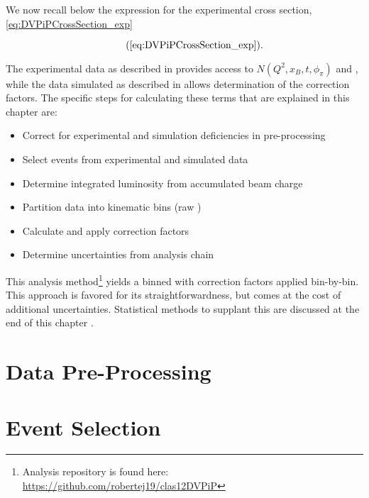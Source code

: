 We now recall below the expression for the experimental cross section, \eqref{eq:DVPiPCrossSection_exp}

        \begin{equation*}
          \recallLabel{eq:DVPiPCrossSection_exp}.
        \end{equation*}

The experimental data as described in  provides access to $N(Q^2,x_B,t,\phi_{\pi})$ and \Lumiint, while the data simulated as described in  allows determination of the correction factors. The specific steps for calculating these terms that are explained in this chapter are: 


\begin{itemize}
  \item Correct for experimental and simulation deficiencies in pre-processing 
  \item Select \dvpip events from experimental and simulated data 
  \item Determine integrated luminosity from accumulated beam charge 
  \item Partition data into kinematic bins (raw \xsec) 
  \item Calculate and apply correction factors 
  \item Determine uncertainties from analysis chain 
\end{itemize}

This analysis method\footnote{Analysis repository is found here:  \href{https://github.com/robertej19/clas12DVPiP}{https://github.com/robertej19/clas12DVPiP}}
  yields a binned \xsec with correction factors applied bin-by-bin. This approach is favored for its straightforwardness, but comes at the cost of additional uncertainties. Statistical methods to supplant this are discussed at the end of this chapter . 


\section{Data Pre-Processing}\label{sec:Ch4_data_preprocess}
    
    \clearpage
    
\section{Event Selection}\label{sec:Ch4_event_selection}
    
    \clearpage
    
